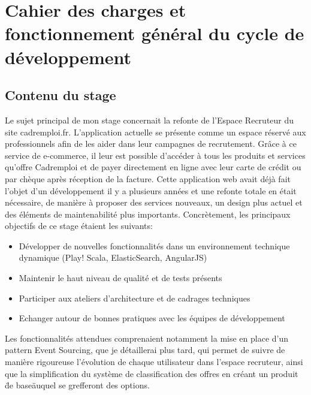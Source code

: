 \section{Cahier des charges et fonctionnement général du cycle de développement}
\subsection{Contenu du stage}
\label{sub:Contenu du stage}
Le sujet principal de mon stage concernait la refonte de l'Espace Recruteur du site cadremploi.fr.
L'application actuelle se présente comme un espace réservé aux professionnels afin de les aider dans leur campagnes de recrutement.
Grâce à ce service de e-commerce, il leur est possible d'accéder à tous les produits et services qu'offre Cadremploi et de payer directement en ligne avec leur carte de crédit ou par chèque après réception de la facture.
Cette application web avait déjà fait l'objet d'un développement il y a plusieurs années et une refonte totale en était nécessaire, de manière à proposer des services nouveaux, un design plus actuel et des éléments de maintenabilité plus importants.
Concrètement, les principaux objectifs de ce stage étaient les suivants:
\begin{itemize}
  \item{} Développer de nouvelles fonctionnalités dans un environnement technique dynamique (Play! Scala, ElasticSearch, AngularJS)
  \item{} Maintenir le haut niveau de qualité et de tests présents
  \item{} Participer aux ateliers d'architecture et de cadrages techniques
  \item{} Echanger autour de bonnes pratiques avec les équipes de développement
\end{itemize}
Les fonctionnalités attendues comprenaient notamment la mise en place d'un pattern Event Sourcing, que je détaillerai plus tard, qui permet de suivre de manière rigoureuse l'évolution de chaque utilisateur dans l'espace recruteur, ainsi que la simplification du système de classification des offres en créant un produit \"de base\" auquel se grefferont des options.
